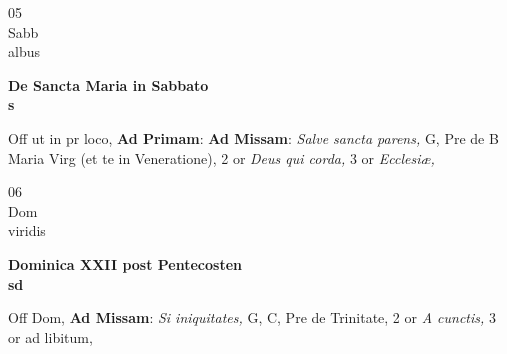 \documentclass[10pt, openany]{book}
\begin{document}
        \begin{center}
            \begin{minipage}{3.5in}
                \vspace{2em}
                \begin{minipage}{0.5in}
                    {\Huge 05} \\
                    {\normalsize Sabb} \\
                    {\normalsize albus}
                \end{minipage}
                \begin{minipage}{3.0in}
                    \textbf{ \large De Sancta Maria in Sabbato \\
                    \textnormal{\normalsize s}} \\ 
                \end{minipage}
                \begin{justify}Off ut in pr loco, \textbf{Ad Primam}: \textbf{Ad Missam}: \textit{Salve sancta parens,} G, Pre de B Maria Virg (et te in Veneratione), 2 or \textit{Deus qui corda,} 3 or \textit{Ecclesiæ,}   
                \end{justify}
            \end{minipage}
        \end{center}
    
        \begin{center}
            \begin{minipage}{3.5in}
                \vspace{2em}
                \begin{minipage}{0.5in}
                    {\Huge 06} \\
                    {\normalsize Dom} \\
                    {\normalsize viridis}
                \end{minipage}
                \begin{minipage}{3.0in}
                    \textbf{ \large Dominica XXII post Pentecosten \\
                    \textnormal{\normalsize sd}} \\ 
                \end{minipage}
                \begin{justify}Off Dom, \textbf{Ad Missam}: \textit{Si iniquitates,} G, C, Pre de Trinitate, 2 or \textit{A cunctis,} 3 or ad libitum,   
                \end{justify}
            \end{minipage}
        \end{center}
    
\end{document}
